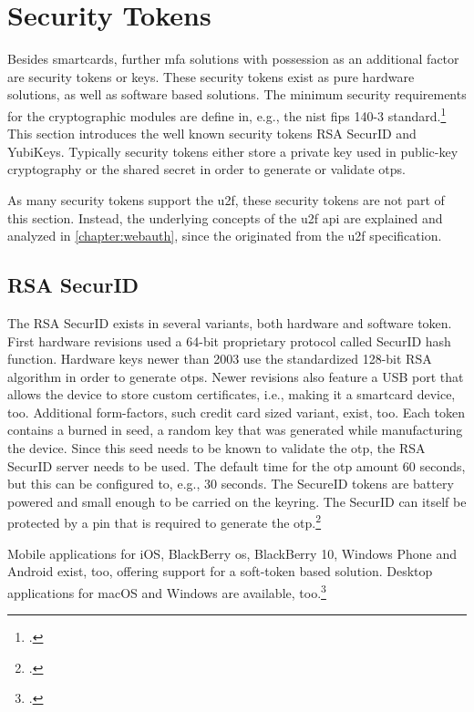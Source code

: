 \section{Security Tokens}

Besides smartcards, further \gls{mfa} solutions with possession as an additional factor are security tokens or keys. These security tokens exist as pure hardware solutions, as well as software based solutions. The minimum security requirements for the cryptographic modules are define in, e.g., the \gls{nist} \gls{fips} 140-3 standard.\footcites[See][]{FIPS140-3} This section introduces the well known security tokens \frqq RSA SecurID\flqq{} and \frqq YubiKeys\flqq. Typically security tokens either store a private key used in public-key cryptography or the shared secret in order to generate or validate \glspl{otp}.

As many security tokens support the \gls{u2f}, these security tokens are not part of this section. Instead, the underlying concepts of the \gls{u2f} \gls{api} are explained and analyzed in \autoref{chapter:webauth}, since the \wa{} originated from the \gls{u2f} specification.

\subsection{RSA SecurID}

The RSA SecurID exists in several variants, both hardware and software token. First hardware revisions used a 64-bit proprietary protocol called \frqq SecurID hash function\flqq. Hardware keys newer than 2003 use the standardized 128-bit RSA algorithm in order to generate \glspl{otp}. Newer revisions also feature a USB port that allows the device to store custom certificates, i.e., making it a smartcard device, too. Additional form-factors, such credit card sized variant, exist, too. Each token contains a burned in seed, a random key that was generated while manufacturing the device. Since this seed needs to be known to validate the \gls{otp}, the RSA SecurID server needs to be used. The default time for the \gls{otp} amount 60 seconds, but this can be configured to, e.g., 30 seconds. The SecureID tokens are battery powered and small enough to be carried on the keyring. The SecurID can itself be protected by a \gls{pin} that is required to generate the \gls{otp}.\footcites[See][479--480]{eckert-it-sec-9}[See][296]{4351500}

Mobile applications for iOS, BlackBerry \gls{os}, BlackBerry 10, Windows Phone and Android exist, too, offering support for a soft-token based solution. Desktop applications for macOS and Windows are available, too.\footcites[See][3--6]{ibm-mfa}[See][49]{5542954}

